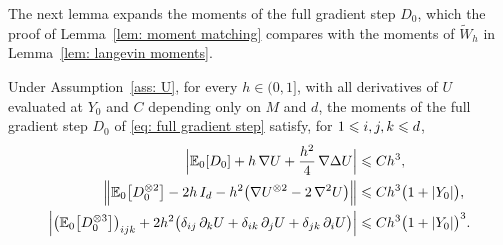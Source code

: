The next lemma expands the moments of the full gradient step $D_0$, which the proof of Lemma~\ref{lem: moment matching} compares with the moments of $\tilde W_h$ in Lemma~\ref{lem: langevin moments}.

\begin{lemma}
\label{lem: step moments}
    Under Assumption~\ref{ass: U}, for every $h \in (0,1]$, with all derivatives of $U$ evaluated at $Y_0$ and $C$ depending only on $M$ and $d$, the moments of the full gradient step $D_0$ of \eqref{eq: full gradient step} satisfy, for $1 \leqslant i,j,k \leqslant d$,
    \begin{align}
        \Bigl| \mathbb E_0[D_0] + h\, \nabla U + \frac{h^2}{4}\, \nabla \Delta U \Bigr| &\leqslant C h^3 , \label{eq: step m1}\\
        \Bigl\| \mathbb E_0\bigl[ D_0^{\otimes 2} \bigr] - 2h\, I_d - h^2 \bigl( \nabla U^{\otimes 2} - 2\, \nabla^2 U \bigr) \Bigr\| &\leqslant C h^3 \bigl( 1+|Y_0| \bigr) , \label{eq: step m2}\\
        \Bigl| \bigl( \mathbb E_0\bigl[ D_0^{\otimes 3} \bigr] \bigr)_{ijk} + 2h^2 \bigl( \delta_{ij}\, \partial_k U + \delta_{ik}\, \partial_j U + \delta_{jk}\, \partial_i U \bigr) \Bigr| &\leqslant C h^3 \bigl( 1+|Y_0| \bigr)^{3} . \label{eq: step m3}
    \end{align}
\end{lemma}

